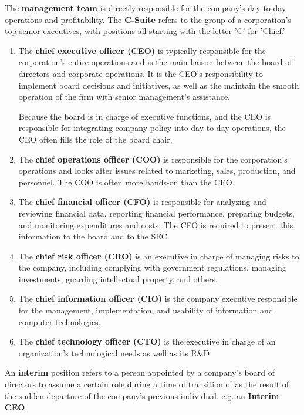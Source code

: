 \documentclass{article}
\begin{document}
    \begin{definition}
      The \textbf{management team} is directly responsible for the company's day-to-day operations and profitability. The \textbf{C-Suite} refers to the group of a corporation's top senior executives, with positions all starting with the letter 'C' for 'Chief.'
      \begin{enumerate}
          \item The \textbf{chief executive officer (CEO)} is typically responsible for the corporation's entire operations and is the main liaison between the board of directors and corporate operations. It is the CEO's responsibility to implement board decisions and initiatives, as well as the maintain the smooth operation of the firm with senior management's assistance. 
          
          Because the board is in charge of executive functions, and the CEO is responsible for integrating company policy into day-to-day operations, the CEO often fills the role of the board chair. 
          \item The \textbf{chief operations officer (COO)} is responsible for the corporation's operations and looks after issues related to marketing, sales, production, and personnel. The COO is often more hands-on than the CEO. 
          \item The \textbf{chief financial officer (CFO)} is responsible for analyzing and reviewing financial data, reporting financial performance, preparing budgets, and monitoring expenditures and costs. The CFO is required to present this information to the board and to the SEC. 
          \item The \textbf{chief risk officer (CRO)} is an executive in charge of managing risks to the company, including complying with government regulations, managing investments, guarding intellectual property, and others. 
          \item The \textbf{chief information officer (CIO)} is the company executive responsible for the management, implementation, and usability of information and computer technologies. 
          \item The \textbf{chief technology officer (CTO)} is the executive in charge of an organization's technological needs as well as its R\&D. 
      \end{enumerate}
    \end{definition}

    \begin{definition}
      An \textbf{interim} position refers to a person appointed by a company's board of directors to assume a certain role during a time of transition of as the result of the sudden departure of the company's previous individual. e.g. an \textbf{Interim CEO}
    \end{definition}
\end{document}
